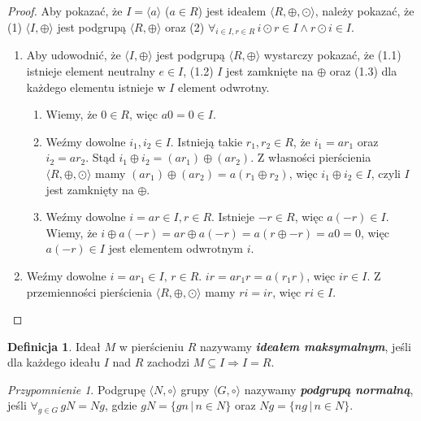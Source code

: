\documentclass[polish,declaration,shortabstract]{iithesis}
\theoremstyle{definition}
\newtheorem{definition}{Definicja}
\theoremstyle{remark} \newtheorem{observation}{Obserwacja}
\theoremstyle{plain} \newtheorem{theorem}{Twierdzenie}
\theoremstyle{plain} \newtheorem{lemma}{Lemat}
\theoremstyle{remark} \newtheorem*{remark*}{Uwaga}
\theoremstyle{reminder} \newtheorem*{reminder*}{Przypomnienie}
\begin{document}
\begin{proof}
	Aby pokazać, że $I = \langle a \rangle$ ($a \in R$) jest ideałem $\langle R, \oplus, \odot \rangle$, należy pokazać, że (1) $\langle I, \oplus \rangle$ jest podgrupą $\langle R, \oplus \rangle$ oraz (2) $\forall_{i \in I, r \in R} \, i \odot r \in I \wedge r \odot i \in I $.
	\begin{enumerate}[label={(\arabic*)}, leftmargin=.4in]
		\item Aby udowodnić, że $\langle I, \oplus \rangle$ jest podgrupą $\langle R, \oplus \rangle$ wystarczy pokazać, że (1.1) istnieje element neutralny $e \in I$, (1.2) $I$ jest zamknięte na $\oplus$ oraz (1.3) dla każdego elementu istnieje w $I$ element odwrotny.
		      \begin{enumerate}[label=(1.\arabic*)]
		      	\item Wiemy, że $0 \in R$, więc $a0=0 \in I$.
		      	\item Weźmy dowolne $i_1, i_2 \in I$. Istnieją takie $r_1, r_2 \in R$, że $i_1 = ar_1$ oraz $i_2 = ar_2$. Stąd $i_1 \oplus i_2 = (ar_1) \oplus (ar_2)$. Z własności pierścienia $\langle R, \oplus, \odot \rangle$ mamy $(ar_1) \oplus (ar_2) = a(r_1 \oplus r_2)$, więc $i_1 \oplus i_2 \in I$, czyli $I$ jest zamknięty na $\oplus$.
		      	\item Weźmy dowolne $i = ar \in I, r \in R$. Istnieje $-r \in R$, więc $a(-r) \in I$. Wiemy, że $i \oplus a(-r) = ar \oplus a(-r) = a(r \oplus -r) = a0 = 0$, więc $a(-r) \in I$ jest elementem odwrotnym $i$.
		      \end{enumerate}
		\item Weźmy dowolne $i = ar_1 \in I, \, r \in R$. $ir = ar_1r = a(r_1r)$, więc $ir \in I$. Z przemienności pierścienia $\langle R, \oplus, \odot \rangle$ mamy $ri = ir$, więc $ri \in I$.
	\end{enumerate}
\end{proof}

\theoremstyle{definition}
\begin{definition}
	Ideał $M$ w pierścieniu $R$ nazywamy \textit{\textbf{ideałem maksymalnym}}, jeśli dla każdego ideału $I$ nad $R$ zachodzi $M \subseteq I \Rightarrow I = R$.
\end{definition}

\begin{reminder*}
	Podgrupę $\langle N, \circ \rangle $ grupy $\langle G, \circ \rangle$ nazywamy \textit{\textbf{podgrupą normalną}}, jeśli $\forall_{g \in G} \, gN = Ng$, gdzie $gN = \{gn \, | \, n \in N\}$ oraz $Ng = \{ng \, | \, n \in N\}$.
\end{reminder*}
\end{document}
